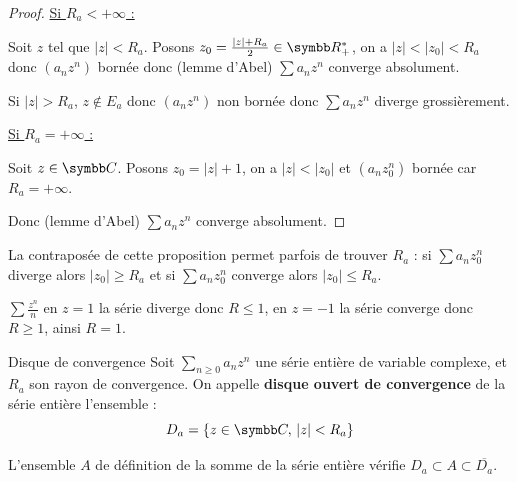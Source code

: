 
\begin{proof} \uline{Si $R_a < +\infty$ :}

    Soit $z$ tel que $|z| < R_a$. 
    Posons $z_0 = \frac{|z| + R_a}{2} \in \R_+^*$, on a $|z| < |z_0| < R_a$ donc 
    $(a_n z^n)$ bornée donc (lemme d'Abel) $\sum a_n z^n$ converge absolument.

    Si $|z| > R_a$, $z \notin E_a$
    donc $(a_n z^n)$ non bornée donc $\sum a_n z^n$ diverge grossièrement.

    \uline{Si $R_a = +\infty$ :} 

    Soit $z \in \C$. Posons $z_0 = |z| + 1$, on a $|z| < |z_0|$ et $(a_nz_0^n)$ bornée car $R_a = + \infty$. 

    Donc (lemme d'Abel) $\sum a_n z^n$ converge absolument.
\end{proof}

\begin{remarque}
    La contraposée de cette proposition permet parfois de trouver $R_a$ : 
    si $\sum a_n z_0^n$ diverge alors $|z_0| \geqslant R_a$ et si $\sum a_n z_0^n$ converge 
    alors $|z_0| \leqslant R_a$.
\end{remarque}

\begin{exemple}
    $\sum \frac{z^n} n$ en $z = 1$ la série diverge donc $R \leqslant 1$, en $z = - 1$ la série 
    converge donc $R \geqslant 1$, ainsi $R = 1$.
\end{exemple}

\begin{definition}{Disque de convergence}{}
    Soit $\sum_{n \geqslant 0} a_n z^n$ une série entière de variable complexe, et $R_a$ 
    son rayon de convergence. On appelle \textbf{disque ouvert de convergence} de la série entière 
    l'ensemble : 
    \[D_a = \{z \in \C, \, |z| < R_a \}\]

    L'ensemble $A$ de définition de la somme de la série entière vérifie $D_a \subset A \subset \overline{D_a}$.
\end{definition}

